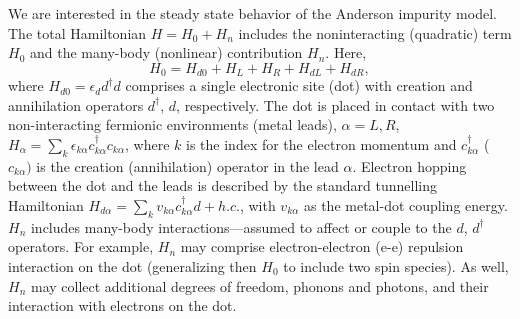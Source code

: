 \documentclass[aps,pra,twocolumn,groupedaddress,showpacs,superscriptaddress,amssymb,amsmath]{revtex4-1}
\newcommand{\be}{\begin{equation}}
\newcommand{\ee}{\end{equation}}
\begin{document}
We are interested in the steady state behavior of the Anderson impurity model. The total Hamiltonian
$H=H_0+H_n$ includes the noninteracting (quadratic) term $H_0$ and the many-body 
(nonlinear) contribution $H_n$. Here,
%
\be
H_0= H_{d0} + H_L + H_R + H_{dL} + H_{dR},
\ee 
%
where  $H_{d0}=\epsilon_d d^{\dagger}d$ comprises a single electronic site (dot) with
creation and annihilation operators $d^{\dagger}$, $d$, respectively.
The dot is placed in contact with two non-interacting fermionic environments (metal leads), $\alpha=L,R$, 
$H_{\alpha}= \sum_{k} \epsilon_{k \alpha} c^{\dagger}_{k \alpha} c_{k \alpha}$, 
where $k$ is the index for the electron momentum
and $c_{k \alpha}^{\dagger}$ ($c_{k \alpha})$ is the creation (annihilation) operator in the lead $\alpha$. 
Electron hopping between the dot and the leads is described by the standard tunnelling Hamiltonian
$H_{d \alpha}= \sum_{k} v_{k \alpha} c_{k\alpha}^{\dagger} d + h.c.$, 
with $v_{k\alpha}$ as the metal-dot coupling energy.
%
$H_n$ includes many-body interactions---assumed to affect or
couple to the $d$, $d^{\dagger}$ operators. 
For example, $H_n$ may comprise electron-electron (e-e) repulsion interaction on the dot (generalizing then
$H_0$ to include two spin species). As well, $H_n$ may
collect additional degrees of freedom, phonons and photons,
and their interaction with electrons on the dot.
\end{document}
